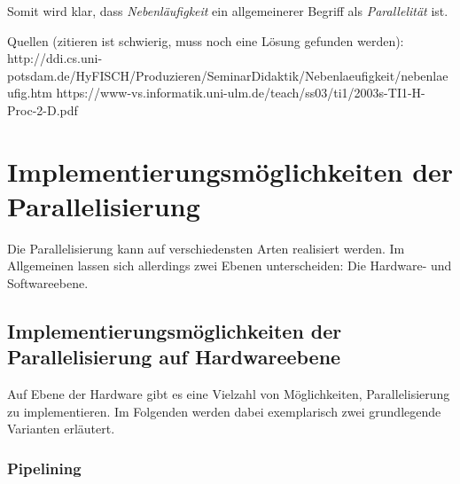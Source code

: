 			Somit wird klar, dass \textit{Nebenläufigkeit} ein allgemeinerer Begriff als \textit{Parallelität} ist. \cite{NebenlaeufigeProg}
			
			Quellen (zitieren ist schwierig, muss noch eine Lösung gefunden werden):
			http://ddi.cs.uni-potsdam.de/HyFISCH/Produzieren/SeminarDidaktik/Nebenlaeufigkeit/nebenlaeufig.htm
			https://www-vs.informatik.uni-ulm.de/teach/ss03/ti1/2003s-TI1-H-Proc-2-D.pdf

	\section{Implementierungsmöglichkeiten der Parallelisierung}
	
		Die Parallelisierung kann auf verschiedensten Arten realisiert werden. Im Allgemeinen lassen sich allerdings zwei Ebenen unterscheiden: Die Hardware- und Softwareebene.
	
		\subsection{Implementierungsmöglichkeiten der Parallelisierung auf Hardwareebene}
		
			Auf Ebene der Hardware gibt es eine Vielzahl von Möglichkeiten, Parallelisierung zu implementieren. Im Folgenden werden dabei exemplarisch zwei grundlegende Varianten erläutert.
					
			\subsubsection{Pipelining}
				
